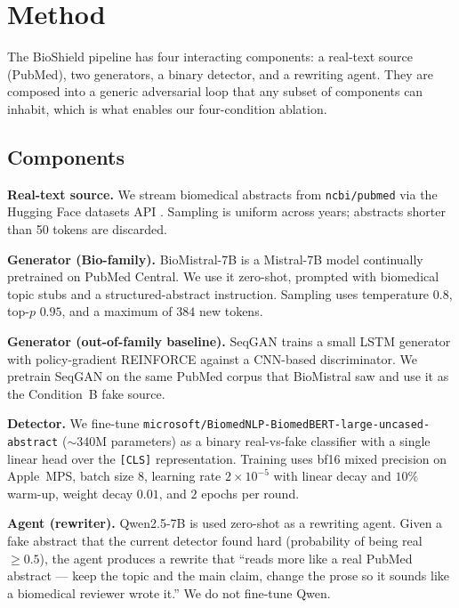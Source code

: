 \section{Method}
\label{sec:method}

The BioShield pipeline has four interacting components: a real-text source
(PubMed), two generators, a binary detector, and a rewriting agent. They are
composed into a generic adversarial loop that any subset of components can
inhabit, which is what enables our four-condition ablation.

\subsection{Components}
\label{ssec:components}

\textbf{Real-text source.} We stream biomedical abstracts from
\texttt{ncbi/pubmed} via the Hugging Face datasets API
\cite{lhoest2021hfdatasets}. Sampling is uniform across years; abstracts
shorter than 50 tokens are discarded.

\textbf{Generator (Bio-family).} BioMistral-7B
\cite{labrak2024biomistral} is a Mistral-7B \cite{jiang2023mistral} model
continually pretrained on PubMed Central. We use it zero-shot, prompted
with biomedical topic stubs and a structured-abstract instruction. Sampling
uses temperature \(0.8\), top-\(p\) \(0.95\), and a maximum of \(384\)
new tokens.

\textbf{Generator (out-of-family baseline).} SeqGAN \cite{yu2017seqgan}
trains a small LSTM generator with policy-gradient REINFORCE against a
CNN-based discriminator. We pretrain SeqGAN on the same PubMed corpus that
BioMistral saw and use it as the Condition~B fake source.

\textbf{Detector.} We fine-tune
\texttt{microsoft/BiomedNLP-BiomedBERT-large-uncased-abstract}
\cite{gu2021biomedbert} (\(\sim\)340M parameters) as a binary
real-vs-fake classifier with a single linear head over the
\texttt{[CLS]} representation. Training uses bf16 mixed precision on
Apple~MPS, batch size \(8\), learning rate \(2 \times 10^{-5}\) with
linear decay and \(10\%\) warm-up, weight decay \(0.01\), and
\(2\) epochs per round.

\textbf{Agent (rewriter).} Qwen2.5-7B \cite{qwen2024technical} is used
zero-shot as a rewriting agent. Given a fake abstract that the current
detector found hard (probability of being real $\geq 0.5$), the agent
produces a rewrite that ``reads more like a real PubMed abstract — keep
the topic and the main claim, change the prose so it sounds like a
biomedical reviewer wrote it.'' We do not fine-tune Qwen.

